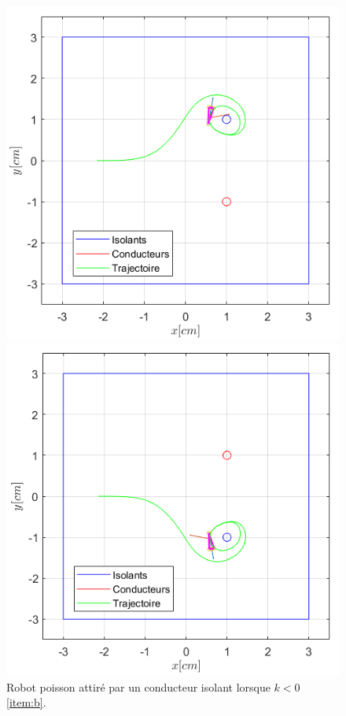 \begin{figure}[h!]
\centering
\begin{minipage}{0.45\textwidth}
  \centering
  \includegraphics[width=\linewidth]{assets/essais/k_inferieur_0/k_inferieur_0.png}
\end{minipage}%
\begin{minipage}{0.45\textwidth}
  \centering
  \includegraphics[width=\linewidth]{assets/essais/k_inferieur_0/k_inferieur_0_2.png}
\end{minipage}
\caption{\centering Robot poisson attiré par un conducteur isolant lorsque $k <0$ \ref{item:b}.}
\label{fig:k_inferieur_0}
\end{figure}

